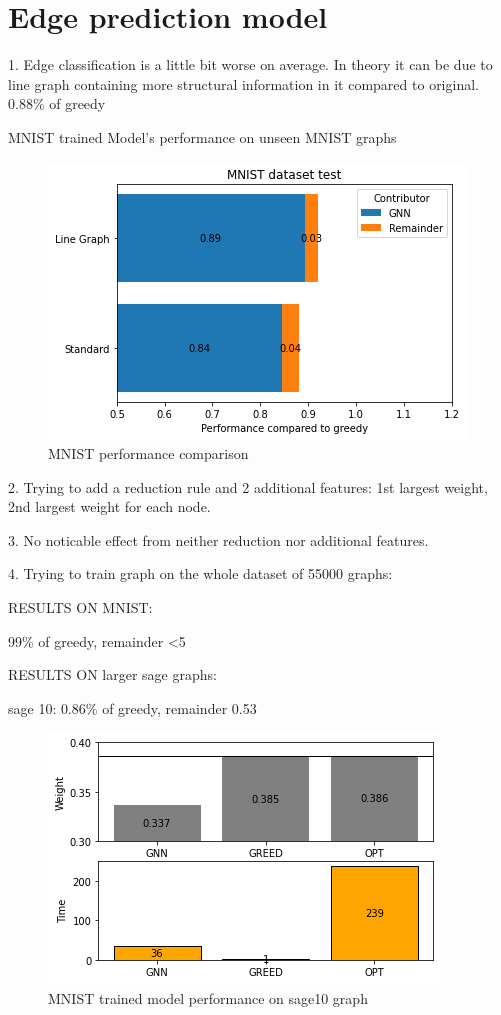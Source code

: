 \section{Edge prediction model}

1. Edge classification is a little bit worse on average. In theory it can be due to line graph containing more structural information in it compared to original. 0.88\% of greedy

MNIST trained Model's performance on unseen MNIST graphs
\begin{figure}[H]
    \centering
    \includegraphics[scale=1.0]{figures/FinalPerformanceMNIST}
    \caption{MNIST performance comparison}
    \label{Model performance on MNIST}
\end{figure}

2. Trying to add a reduction rule and 2 additional features: 1st largest weight, 2nd largest weight for each node.

3. No noticable effect from neither reduction nor additional features.

4. Trying to train graph on the whole dataset of 55000 graphs:

RESULTS ON MNIST:

99\% of greedy, remainder <5%

RESULTS ON larger sage graphs:

sage 10: 0.86\% of greedy, remainder 0.53

\begin{figure}[H]
    \centering
    \includegraphics[scale=1.0]{figures/MNISTtrainSAGE10}
    \caption{MNIST trained model performance on sage10 graph}
    \label{model performance}
\end{figure}

